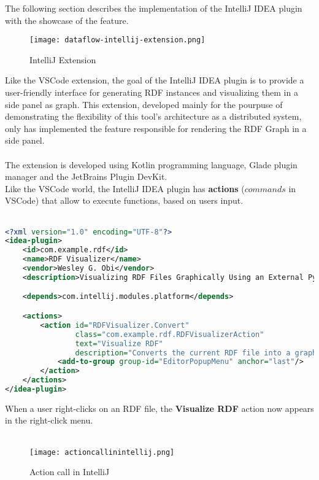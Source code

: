 The following section describes the implementation of the IntelliJ IDEA plugin with the showcase of the feature. 

\begin{figure}[htb]
	\centering
	\texttt{[image: dataflow-intellij-extension.png]}
	\caption{IntelliJ Extension}
	\label{fig:intellijextension}
  \end{figure}

Like the VSCode extension, the goal of the IntelliJ IDEA plugin is to provide a user-friendly interface for generating RDF instances and visualizing them in a side panel as graph.
This extension, developed mainly for the pourpuse of demonstrating the flexibility of this tool's architecture as a distributed system, only has implemented the feature responsible for rendering the RDF Graph in a side panel.
\\
\\
The extension is developed using Kotlin programming language, Glade plugin manager and the JetBrains Plugin DevKit.
\\
Like the VSCode world, the IntelliJ IDEA plugin has \textbf{actions} ($commands$ in VSCode) that allow to execute functions, based on users input.
\\
\\
\begin{lstlisting}[caption={IntelliJ Actions}, label={lst:actions}, language=xml]
<?xml version="1.0" encoding="UTF-8"?>
<idea-plugin>
    <id>com.example.rdf</id>
    <name>RDF Visualizer</name>
    <vendor>Wesley G. Obi</vendor>
    <description>Visualizing RDF Files Graphically Using an External Python Service</description>

    <depends>com.intellij.modules.platform</depends>

    <actions>
        <action id="RDFVisualizer.Convert"
                class="com.example.rdf.RDFVisualizerAction"
                text="Visualize RDF"
                description="Converts the current RDF file into a graphical visualization">
            <add-to-group group-id="EditorPopupMenu" anchor="last"/>
        </action>
    </actions>
</idea-plugin>
\end{lstlisting}

When a user right-clicks on an RDF file, the \textbf{Visualize RDF} action now appears in the right-click menu.
\\
\\
\begin{figure}[htb]
	\centering
	\texttt{[image: actioncallinintellij.png]}
	\caption{Action call in IntelliJ}
	\label{fig:actioncallinintellija}
  \end{figure}

